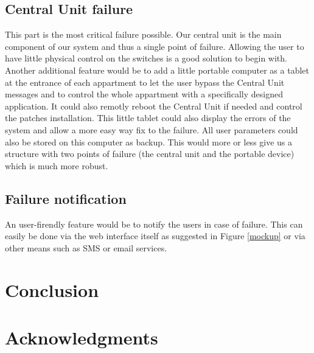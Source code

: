 \documentclass{acm_proc_article-sp}
\begin{document}
\subsection{Central Unit failure}
This part is the most critical failure possible.
Our central unit is the main component of our system and thus a single point of failure.
Allowing the user to have little physical control on the switches is a good solution to begin with.
Another additional feature would be to add a little portable computer as a tablet at the entrance of each appartment 
to let the user bypass the Central Unit messages and to control the whole appartment with a specifically designed application.
It could also remotly reboot the Central Unit if needed and control the patches installation.
This little tablet could also display the errors of the system and allow a more easy way fix to the failure.
All user parameters could also be stored on this computer as backup.
This would more or less give us a structure with two points of failure (the central unit and the portable device) which is much more robust.

\subsection{Failure notification}
An user-firendly feature would be to notify the users in case of failure. This can easily be done via the web interface itself as suggested in Figure \ref{mockup} or via other means such as SMS or email services.

\section{Conclusion}




\section{Acknowledgments}



\nocite{*}

\end{document}

